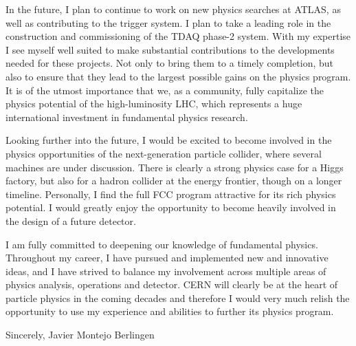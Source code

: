 \documentclass[11pt,a4paper,sans]{moderncv}        %
\begin{document}
In the future, I plan to continue to work on new physics searches at ATLAS, as well as contributing to the trigger system. 
I plan to take a leading role in the construction and commissioning of the TDAQ phase-2 system.
With my expertise I see myself well suited to make substantial contributions to the developments needed for these projects. Not only to bring them to a timely completion, but also to ensure that they lead to the largest possible gains on the physics program. 
It is of the utmost importance that we, as a community, fully 
capitalize the physics potential of the high-luminosity LHC, which represents a huge international 
investment in fundamental physics research.
\newline

Looking further into the future, I would be excited to become involved in the physics opportunities of the next-generation particle collider, where several machines are under discussion. There is clearly a strong physics case for a Higgs factory, but also for a hadron collider at the energy frontier, though on a longer timeline. Personally, I find the full FCC program attractive for its rich physics potential. 
I would greatly enjoy the opportunity to become heavily involved in the design of a future detector.
\newline

I am fully committed to deepening our knowledge of fundamental physics.
Throughout my career, I have pursued and implemented new and innovative ideas, and I have strived to balance my involvement across multiple areas of physics analysis, operations and detector. 
CERN will clearly be at the heart of particle physics in the coming decades and 
therefore I would very much relish the opportunity to use my experience and 
abilities to further its physics program.
\newline


Sincerely,
\vfill
Javier Montejo Berlingen
\end{document}
